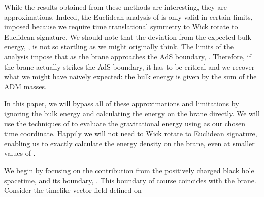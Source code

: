 \documentclass[a4paper,12pt]{article}
\begin{document}
While the results obtained from these methods are interesting, they
are approximations. Indeed, the Euclidean analysis of
\cite{Padilla:CFT} is only valid in certain limits, imposed because we
require time translational symmetry to Wick rotate to Euclidean
signature. We should note that the deviation from the expected bulk
energy, \coordHE{}, is not so startling as we might originally think. The
limits of the analysis impose that as the brane approaches the AdS
boundary, \coordHE{}. Therefore, if the brane actually strikes
the AdS boundary, it has to be critical and we recover what we might
have na\"\i vely expected: the bulk energy is given by the sum of the
ADM masses.

In this paper, we will bypass all of these approximations and
limitations by ignoring the bulk energy and calculating the energy on
the brane directly. We will use the techniques of
\cite{Hawking:hamiltonian} to evaluate the gravitational energy using
\myHighlight{$\tau$}\coordHE{} as our chosen time coordinate. Happily we will not need to Wick
rotate to Euclidean signature, enabling us to exactly calculate the
energy density on the brane, even at smaller values of \coordHE{}.

We begin by focusing on the contribution from the positively charged
black hole spacetime, \coordHE{} and its boundary,
\coordHE{}.  This boundary of course coincides with the
brane. Consider the timelike vector field defined on \coordHE{}
\end{document}
